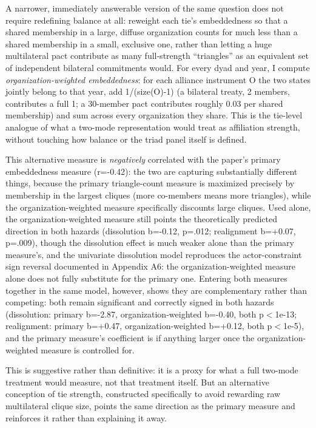 \documentclass[Afour,sageh,times,doublespace]{sagej}
\begin{document}
A narrower, immediately answerable version of the same question does not require redefining balance at all: reweight each tie's embeddedness so that a shared membership in a large, diffuse organization counts for much less than a shared membership in a small, exclusive one, rather than letting a huge multilateral pact contribute as many full-strength ``triangles'' as an equivalent set of independent bilateral commitments would. For every dyad and year, I compute \emph{organization-weighted embeddedness}: for each alliance instrument O the two states jointly belong to that year, add 1/(size(O)-1) (a bilateral treaty, 2 members, contributes a full 1; a 30-member pact contributes roughly 0.03 per shared membership) and sum across every organization they share. This is the tie-level analogue of what a two-mode representation would treat as affiliation strength, without touching how balance or the triad panel itself is defined.

This alternative measure is \emph{negatively} correlated with the paper's primary embeddedness measure (r=-0.42): the two are capturing substantially different things, because the primary triangle-count measure is maximized precisely by membership in the largest cliques (more co-members means more triangles), while the organization-weighted measure specifically discounts large cliques. Used alone, the organization-weighted measure still points the theoretically predicted direction in both hazards (dissolution b=-0.12, p=.012; realignment b=+0.07, p=.009), though the dissolution effect is much weaker alone than the primary measure's, and the univariate dissolution model reproduces the actor-constraint sign reversal documented in Appendix A6: the organization-weighted measure alone does not fully substitute for the primary one. Entering both measures together in the same model, however, shows they are complementary rather than competing: both remain significant and correctly signed in both hazards (dissolution: primary b=-2.87, organization-weighted b=-0.40, both p$<$1e-13; realignment: primary b=+0.47, organization-weighted b=+0.12, both p$<$1e-5), and the primary measure's coefficient is if anything larger once the organization-weighted measure is controlled for.

This is suggestive rather than definitive: it is a proxy for what a full two-mode treatment would measure, not that treatment itself. But an alternative conception of tie strength, constructed specifically to avoid rewarding raw multilateral clique size, points the same direction as the primary measure and reinforces it rather than explaining it away.
\end{document}
